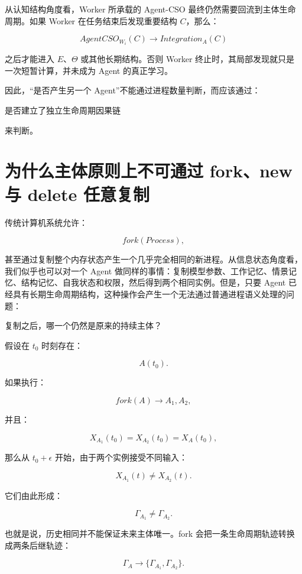 从认知结构角度看，Worker 所承载的 Agent-CSO 最终仍然需要回流到主体生命周期。如果 Worker 在任务结束后发现重要结构 $C$，那么：

\[
AgentCSO_{W_i}(C)
\rightarrow
Integration_A(C)
\]

之后才能进入 $E$、$\Theta$ 或其他长期结构。否则 Worker 终止时，其局部发现就只是一次短暂计算，并未成为 Agent 的真正学习。

因此，“是否产生另一个 Agent”不能通过进程数量判断，而应该通过：

\begin{proposition*}
是否建立了独立生命周期因果链
\end{proposition*}

来判断。

\section{为什么主体原则上不可通过 fork、new 与 delete 任意复制}

传统计算机系统允许：

\[
fork(Process),
\]

甚至通过复制整个内存状态产生一个几乎完全相同的新进程。从信息状态角度看，我们似乎也可以对一个 Agent 做同样的事情：复制模型参数、工作记忆、情景记忆、结构记忆、自我状态和权限，然后得到两个相同实例。但是，只要 Agent 已经具有长期生命周期结构，这种操作会产生一个无法通过普通进程语义处理的问题：

\begin{statementbox}
复制之后，哪一个仍然是原来的持续主体？
\end{statementbox}

假设在 $t_0$ 时刻存在：

\[
A(t_0).
\]

如果执行：

\[
fork(A)
\rightarrow
A_1,A_2,
\]

并且：

\[
X_{A_1}(t_0)
=
X_{A_2}(t_0)
=
X_A(t_0),
\]

那么从 $t_0+\epsilon$ 开始，由于两个实例接受不同输入：

\[
X_{A_1}(t)
\neq
X_{A_2}(t).
\]

它们由此形成：

\[
\Gamma_{A_1}
\neq
\Gamma_{A_2}.
\]

也就是说，历史相同并不能保证未来主体唯一。fork 会把一条生命周期轨迹转换成两条后继轨迹：

\[
\Gamma_A
\rightarrow
\{
\Gamma_{A_1},
\Gamma_{A_2}
\}.
\]

